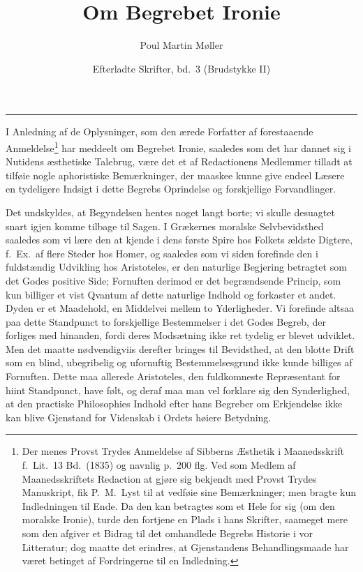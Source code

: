 \documentclass[12pt]{article}
\title{\textbf{Om Begrebet Ironie}}
\author{Poul Martin Møller}
\date{Efterladte Skrifter, bd.\ 3 (Brudstykke II)}
\newcommand{\opage}[1]{\marginnote{\footnotesize\textit{[#1]}}}
\begin{document}
\maketitle

\begin{center}\rule{0.32\textwidth}{0.4pt}\end{center}
\medskip

\opage{152}I Anledning af de Oplysninger, som den ærede Forfatter af forestaaende Anmeldelse\footnote{Der menes Provst Trydes Anmeldelse af Sibberns Æsthetik i Maanedsskrift f.\ Lit.\ 13 Bd.\ (1835) og navnlig p.\ 200 flg. Ved som Medlem af Maanedsskriftets Redaction at gjøre sig bekjendt med Provst Trydes Manuskript, fik P.\ M.\ Lyst til at vedføie sine Bemærkninger; men bragte kun Indledningen til Ende. Da den kan betragtes som et Hele for sig (om den moralske Ironie), turde den fortjene en Plads i hans Skrifter, saameget mere som den afgiver et Bidrag til det omhandlede Begrebs Historie i vor Litteratur; dog maatte det erindres, at Gjenstandens Behandlingsmaade har været betinget af Fordringerne til en Indledning.} har meddeelt om Begrebet Ironie, saaledes som det har dannet sig i Nutidens æsthetiske Talebrug, være det et af Redactionens Medlemmer tilladt at tilføie nogle aphoristiske Bemærkninger, der maaskee kunne give endeel Læsere en tydeligere Indsigt i dette Begrebs Oprindelse og forskjellige Forvandlinger.

Det undskyldes, at Begyndelsen hentes noget langt borte; vi skulle desuagtet snart igjen komme tilbage til Sagen. I Grækernes moralske Selvbevidsthed saaledes som vi lære den at kjende i dens første Spire hos Folkets ældste Digtere, f.\ Ex.\ af flere Steder hos Homer, og saaledes som vi siden forefinde den i fuldstændig Udvikling hos Aristoteles, er den naturlige Begjering betragtet som det Godes positive Side; Fornuften derimod er det begrændsende Princip, som kun billiger et vist Qvantum af dette \opage{153}naturlige Indhold og forkaster et andet. Dyden er et Maadehold, en Middelvei mellem to Yderligheder. Vi forefinde altsaa paa dette Standpunct to forskjellige Bestemmelser i det Godes Begreb, der forliges med hinanden, fordi deres Modsætning ikke ret tydelig er blevet udviklet. Men det maatte nødvendigviis derefter bringes til Bevidsthed, at den blotte Drift som en blind, ubegribelig og ufornuftig Bestemmelsesgrund ikke kunde billiges af Fornuften. Dette maa allerede Aristoteles, den fuldkomneste Repræsentant for hiint Standpunct, have følt, og deraf maa man vel forklare sig den Synderlighed, at den practiske Philosophies Indhold efter hans Begreber om Erkjendelse ikke kan blive Gjenstand for Videnskab i Ordets høiere Betydning.
\end{document}
